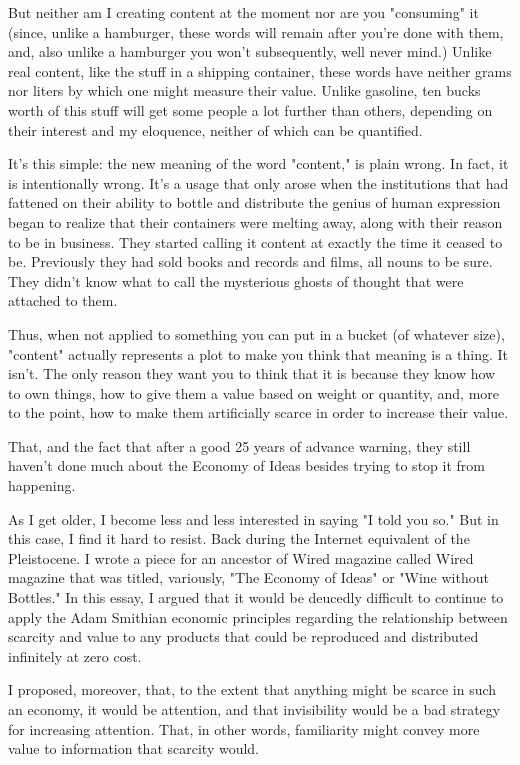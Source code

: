 But neither am I creating content at the moment nor are you
"consuming" it (since, unlike a hamburger, these words will remain
after you're done with them, and, also unlike a hamburger you won't
subsequently, well never mind.) Unlike real content, like the
stuff in a shipping container, these words have neither grams nor
liters by which one might measure their value. Unlike gasoline, ten
bucks worth of this stuff will get some people a lot further than
others, depending on their interest and my eloquence, neither of
which can be quantified.

It's this simple: the new meaning of the word "content," is plain
wrong. In fact, it is intentionally wrong. It's a usage that only
arose when the institutions that had fattened on their ability to
bottle and distribute the genius of human expression began to
realize that their containers were melting away, along with their
reason to be in business. They started calling it content at
exactly the time it ceased to be. Previously they had sold books
and records and films, all nouns to be sure. They didn't know what
to call the mysterious ghosts of thought that were attached to
them.

Thus, when not applied to something you can put in a bucket (of
whatever size), "content" actually represents a plot to make you
think that meaning is a thing. It isn't. The only reason they want
you to think that it is because they know how to own things, how to
give them a value based on weight or quantity, and, more to the
point, how to make them artificially scarce in order to increase
their value.

That, and the fact that after a good 25 years of advance warning,
they still haven't done much about the Economy of Ideas besides
trying to stop it from happening.

As I get older, I become less and less interested in saying "I told
you so." But in this case, I find it hard to resist. Back during
the Internet equivalent of the Pleistocene. I wrote a piece for an
ancestor of Wired magazine called Wired magazine that was titled,
variously, "The Economy of Ideas" or "Wine without Bottles." In
this essay, I argued that it would be deucedly difficult to
continue to apply the Adam Smithian economic principles regarding
the relationship between scarcity and value to any products that
could be reproduced and distributed infinitely at zero cost.

I proposed, moreover, that, to the extent that anything might be
scarce in such an economy, it would be attention, and that
invisibility would be a bad strategy for increasing attention.
That, in other words, familiarity might convey more value to
information that scarcity would.

